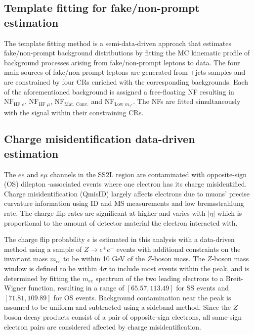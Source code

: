 \documentclass[../thesis.tex]{subfiles}
\begin{document}
\subsection{Template fitting for fake/non-prompt estimation}
\label{sec:template}
The template fitting method is a semi-data-driven approach \citep{bg:ttH_ttW_ML} that estimates fake/non-prompt background distributions by fitting the \acs{MC} kinematic profile of background processes arising from fake/non-prompt leptons to data. The four main sources of fake/non-prompt leptons are generated from \ttbar+jets samples and are constrained by four \acs{CR}s enriched with the corresponding backgrounds. Each of the aforementioned background is assigned a free-floating \acs{NF} resulting in $\mathrm{NF}_{\text{HF }e}$, $\mathrm{NF}_{\text{HF }\mu}$, $\mathrm{NF}_{\text{Mat. Conv.}}$ and $\mathrm{NF}_{\text{Low }m_{\gamma^{*}}}$. The \acs{NF}s are fitted simultaneously with the signal within their constraining \acs{CR}s.

\subsection{Charge misidentification data-driven estimation}
\label{sec:qmisid}
The $ee$ and $e\mu$ channels in the \acs{SS2L} \tttt region are contaminated with opposite-sign (\acs{OS}) dilepton \ttbar-associated events where one electron has its charge misidentified. Charge misidentification (\acs{QmisID}) largely affects electrons due to muons' precise curvature information using \acs{ID} and \acs{MS} measurements and low bremsstrahlung rate. The charge flip rates are significant at higher \pT and varies with $|\eta|$ which is proportional to the amount of detector material the electron interacted with.

The charge flip probability $\epsilon$ is estimated in this analysis with a data-driven method \citep{EXOT-2016-16} using a sample of $Z\rightarrow e^+e^-$ events with additional constraints on the invariant mass $m_{ee}$ to be within 10 GeV of the $Z$-boson mass. The $Z$-boson mass window is defined to be within $4\sigma$ to include most events within the peak, and is determined by fitting the $m_{ee}$ spectrum of the two leading electrons to a Breit-Wigner function, resulting in a range of $[65.57, 113.49]$ for SS events and $[71.81, 109.89]$ for \acs{OS} events. Background contamination near the peak is assumed to be uniform and subtracted using a sideband method. Since the $Z$-boson decay products consist of a pair of opposite-sign electrons, all same-sign electron pairs are considered affected by charge misidentification.
\end{document}
